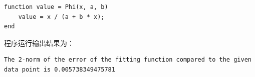\documentclass[12pt,a4paper,UTF8]{ctexart}
\theoremstyle{nonumberplain}
\begin{document}
\begin{enumerate}
\begin{lstlisting}[frame=single]
function value = Phi(x, a, b)
    value = x / (a + b * x);
end

\end{lstlisting}
          \par 程序运行输出结果为：
          \begin{lstlisting}[frame=single]
The 2-norm of the error of the fitting function compared to the given data point is 0.005738349475781
\end{lstlisting}
\end{enumerate}
\end{document}
